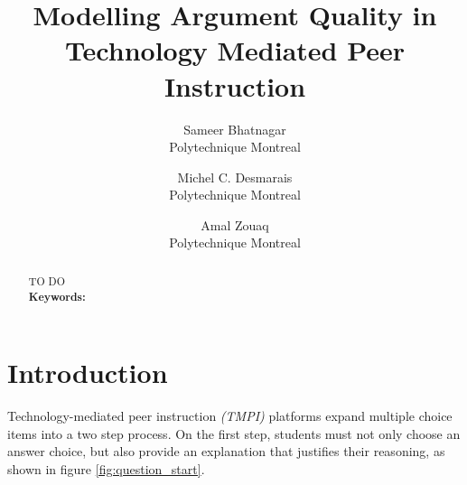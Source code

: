 \documentclass[notitlepage,12pt]{jedm}
\begin{document}
	
	\title{Modelling Argument Quality in Technology Mediated Peer Instruction}
	\date{} %
	
	\author{
		{\large Sameer Bhatnagar}
		\\Polytechnique Montreal
	 	\and 
	 	{\large Michel C. Desmarais}
	 	\\Polytechnique Montreal
	 	\and 
	 	{\large Amal Zouaq}
 		\\Polytechnique Montreal
 }

	
	\maketitle
	
	\begin{abstract}
		TO DO
		\\ %
		
		{\parindent0pt
			\textbf{Keywords:} 
		}
	\end{abstract}

\section{Introduction}
Technology-mediated peer instruction \textit{(TMPI)} platforms 
\cite{charles_harnessing_2019}\cite{univeristy_of_british_columbia_ubc/ubcpi_2019}
expand multiple choice items into a two step process.
On the first step, students must not only choose an answer choice, but also 
provide an explanation that justifies their reasoning, as shown in figure 
\ref{fig:question_start}.
\end{document}
